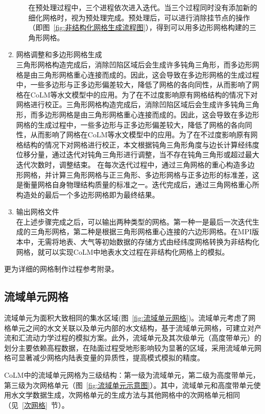 \begin{enumerate}
\begin{enumerate}
在预处理过程中，三个进程依次进入迭代。当三个过程同时没有添加新的细化网格时，视为预处理完成。预处理后，可以进行消除挂节点的操作（即图~\ref{fig:非结构化网格生成流程图}），得到可以用多边形网格构建的三角形网格。
\end{enumerate}
\item 网格调整和多边形网格生成\\
三角形网格构造完成后，消除凹陷区域后会生成许多钝角三角形，而多边形网格是由三角形网格重心连接而成的。因此，这会导致在多边形网格的生成过程中，一些多边形与正多边形偏差较大，降低了网格的各向同性，从而影响了网格在CoLM等水文模型中的应用。为了在不过度影响原有网格结构的情况下对网格进行校正。三角形网格构造完成后，消除凹陷区域后会生成许多钝角三角形，而多边形网格是由三角形网格重心连接而成的。因此，这会导致在多边形网格的生成过程中，一些多边形与正多边形偏差较大，降低了网格的各向同性，从而影响了网格在CoLM等水文模型中的应用。为了在不过度影响原有网格结构的情况下对网格进行校正，本文根据钝角三角形角度与边长计算经纬度位移分量，通过迭代对钝角三角形进行调整，当不存在钝角三角形或超过最大迭代次数时，调整结束。
在每次迭代过程中，通过三角网格的重心构造多边形网格，并计算三角形网格与正三角形、多边形网格与正多边形的标准差，这是衡量网格自身物理结构质量的标准之一。迭代完成后，通过三角网格重心所构造处的最后一个多边形网格即为最终结果。
\item 输出网格文件\\
在上述步骤完成之后，可以输出两种类型的网格。第一种一是最后一次迭代生成的三角形网格，第二种是根据三角形网格重心连接的六边形网格。在MPI版本中，无需将地表、大气等初始数据的存储方式由经纬度网格转换为非结构化网格，就可以实现CoLM中地表水文过程在非结构化网格上的模拟。
\end{enumerate}

更为详细的网格制作过程参考附录。

\subsection{流域单元网格}\label{流域单元网格}
流域单元为面积大致相同的集水区域(图~\ref{fig:流域单元网格})。流域单元考虑了网格单元之间的水文关联以及单元内部的水文结构，基于流域单元网格，可建立对产流和汇流动力学过程的模拟方案。此外，流域单元及其次级单元（高度带单元）的划分主要依赖高程数据，在陆面过程受地形影响较为显著的区域，采用流域单元网格可显著减少网格内陆表变量的异质性，提高模式模拟的精度。

CoLM中的流域单元网格为三级结构：第一级为流域单元，第二级为高度带单元，第三级为次网格单元（图~\ref{fig:流域单元示意图}）。其中，流域单元和高度带单元使用水文学数据生成，次网格单元的生成方法与其他网格中的次网格单元相同（见~\ref{次网格}~节）。

